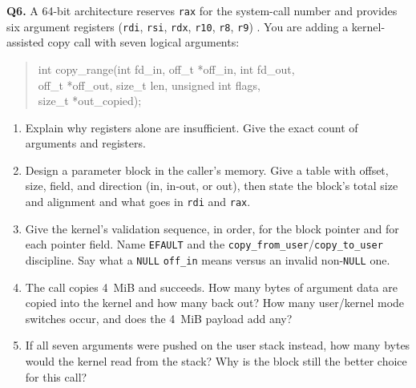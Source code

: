 \documentclass[11pt]{article}
\begin{document}
\textbf{Q6.} A 64-bit architecture reserves \texttt{rax} for the system-call number and provides six argument registers (\texttt{rdi}, \texttt{rsi}, \texttt{rdx}, \texttt{r10}, \texttt{r8}, \texttt{r9}) \cite{BovetCesati_understanding_linux_kernel}. You are adding a kernel-assisted copy call with seven logical arguments:
\begin{quote}
\ttfamily\small
int copy\_range(int fd\_in, off\_t *off\_in, int fd\_out,\\
\hspace*{4.2em}off\_t *off\_out, size\_t len, unsigned int flags,\\
\hspace*{4.2em}size\_t *out\_copied);
\end{quote}
\begin{enumerate}
  \item[(a)] Explain why registers alone are insufficient. Give the exact count of arguments and registers.
  \item[(b)] Design a parameter block in the caller's memory. Give a table with offset, size, field, and direction (in, in-out, or out), then state the block's total size and alignment and what goes in \texttt{rdi} and \texttt{rax}.
  \item[(c)] Give the kernel's validation sequence, in order, for the block pointer and for each pointer field. Name \texttt{EFAULT} and the \texttt{copy\_from\_user}/\texttt{copy\_to\_user} discipline. Say what a \texttt{NULL} \texttt{off\_in} means versus an invalid non-\texttt{NULL} one.
  \item[(d)] The call copies 4~MiB and succeeds. How many bytes of argument data are copied into the kernel and how many back out? How many user/kernel mode switches occur, and does the 4~MiB payload add any?
  \item[(e)] If all seven arguments were pushed on the user stack instead, how many bytes would the kernel read from the stack? Why is the block still the better choice for this call?
\end{enumerate}



\end{document}
